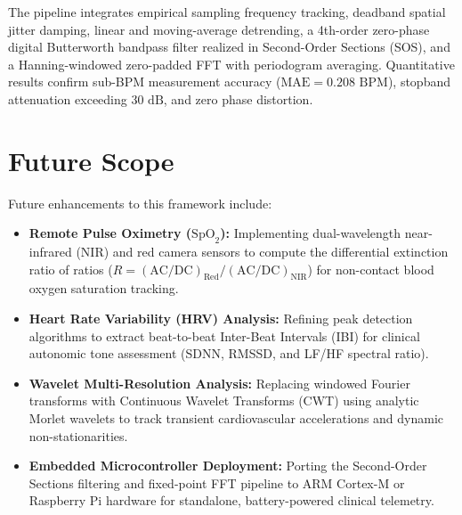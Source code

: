 \documentclass[11pt,a4paper]{report}
\begin{document}
The pipeline integrates empirical sampling frequency tracking, deadband spatial jitter damping, linear and moving-average detrending, a 4th-order zero-phase digital Butterworth bandpass filter realized in Second-Order Sections (SOS), and a Hanning-windowed zero-padded FFT with periodogram averaging. Quantitative results confirm sub-BPM measurement accuracy ($\text{MAE} = 0.208\text{ BPM}$), stopband attenuation exceeding $30\text{ dB}$, and zero phase distortion.

\section{Future Scope}
Future enhancements to this framework include:
\begin{itemize}
    \item \textbf{Remote Pulse Oximetry (\texorpdfstring{$\text{SpO}_2$}{SpO2}):} Implementing dual-wavelength near-infrared (NIR) and red camera sensors to compute the differential extinction ratio of ratios ($R = (\text{AC}/\text{DC})_{\text{Red}} / (\text{AC}/\text{DC})_{\text{NIR}}$) for non-contact blood oxygen saturation tracking.
    \item \textbf{Heart Rate Variability (HRV) Analysis:} Refining peak detection algorithms to extract beat-to-beat Inter-Beat Intervals (IBI) for clinical autonomic tone assessment (SDNN, RMSSD, and LF/HF spectral ratio).
    \item \textbf{Wavelet Multi-Resolution Analysis:} Replacing windowed Fourier transforms with Continuous Wavelet Transforms (CWT) using analytic Morlet wavelets to track transient cardiovascular accelerations and dynamic non-stationarities.
    \item \textbf{Embedded Microcontroller Deployment:} Porting the Second-Order Sections filtering and fixed-point FFT pipeline to ARM Cortex-M or Raspberry Pi hardware for standalone, battery-powered clinical telemetry.
\end{itemize}
\end{document}
